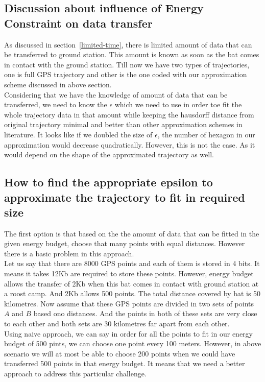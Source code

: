\documentclass[conference]{IEEEtran}
\begin{document}
 \subsection{Discussion about influence of Energy Constraint on data transfer}
As discussed in section~\ref{limited-time}, there is limited amount of data that can be transferred to ground station. This amount is known as soon as the bat comes in contact with the ground station. Till now we have two types of trajectories, one is full GPS trajectory and other is the one coded with our approximation scheme discussed in above section.\\
Considering that we have the knowledge of amount of data that can be transferred, we need to know the $\epsilon$ which we need to use in order toe fit the whole trajectory data in that amount while keeping the hausdorff distance from original trajectory minimal and better than other approximation schemes in literature. It looks like if we doubled the size of $\epsilon$, the number of hexagon in our approximation would decrease quadratically. However, this is not the case. As it would depend on the shape of the approximated trajectory as well.  

\subsection{How to find the appropriate epsilon to approximate the trajectory to fit in required size}\label{sec:size-fitting}
The first option is that based on the the amount of data that can be fitted in the given energy budget, choose that many points with equal distances. However there is a basic problem in this approach.\\
Let us say that there are 8000 GPS points and each of them is stored in 4 bits. It means it takes 12Kb are required to store these points. However, energy budget allows the transfer of 2Kb when this bat comes in contact with ground station at a roost camp. And 2Kb allows 500 points. The total distance covered by bat is 50 kilometres. Now assume that these GPS points are divided in two sets of points $A$ and $B$ based ono distances. And the points in both of these sets are very close to each other and both sets are 30 kilometres far apart from each other. \\
Using naive approach, we can say in order for all the points to fit in our energy budget of 500 pints, we can choose one point every 100 meters. However, in above scenario we will at most be able to choose 200 points when we could have transferred 500 points in that energy budget. It means that we need a better approach to address this particular challenge.
\end{document}
